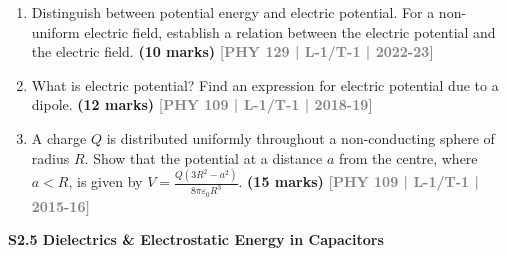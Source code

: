 \documentclass[12pt,a3paper]{article}
\newcommand{\yr}[1]{\hfill\textcolor{gray}{\small\textbf{[#1]}}}
\newcommand{\mk}[1]{\textcolor{orange!70!black}{\small\textbf{(#1 marks)}}}
\newcommand{\subtopic}[2]{%
  \vspace{10pt}
  \noindent\begin{tcolorbox}[colback=#1!8,colframe=#1,boxrule=0.6pt,arc=4pt,
    left=6pt,right=6pt,top=4pt,bottom=4pt]
    \small\bfseries\textcolor{#1}{#2}
  \end{tcolorbox}
  \vspace{2pt}
}
\begin{document}
\begin{enumerate}

\item Distinguish between potential energy and electric potential. For a non-uniform electric field, establish a relation between the electric potential and the electric field.
\mk{10} \yr{PHY 129 | L-1/T-1 | 2022-23}

\item What is electric potential? Find an expression for electric potential due to a dipole.
\mk{12} \yr{PHY 109 | L-1/T-1 | 2018-19}

\item A charge $Q$ is distributed uniformly throughout a non-conducting sphere of radius $R$. Show that the potential at a distance $a$ from the centre, where $a < R$, is given by $V = \frac{Q(3R^2 - a^2)}{8\pi\varepsilon_0 R^3}$.
\mk{15} \yr{PHY 109 | L-1/T-1 | 2015-16}

\end{enumerate}

\label{sec:s25}
\subtopic{cA}{S2.5 \quad Dielectrics \& Electrostatic Energy in Capacitors}
\end{document}

